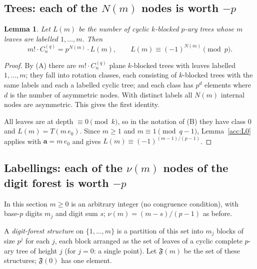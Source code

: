 \documentclass[11pt]{article}
\newtheorem{lemma}[theorem]{Lemma}
\theoremstyle{definition}
\theoremstyle{remark}
\numberwithin{equation}{section}
\numberwithin{figure}{section}
\newcommand{\C}{C_n^{(q)}}
\newcommand{\F}{\mathfrak F}
\begin{document}
\subsection{Trees: each of the $N(m)$ nodes is worth $-p$}

\begin{lemma}\label{acc:L1}
Let $L(m)$ be the number of cyclic $k$-blocked $p$-ary trees whose $m$ leaves are labelled
$1,\dots,m$. Then
\[
 m!\cdot\C=p^{N(m)}\cdot L(m),\qquad L(m)\equiv(-1)^{N(m)}\pmod p .
\]
\end{lemma}
\begin{proof}
By (A) there are $m!\cdot\C$ plane $k$-blocked trees with leaves labelled $1,\dots,m$; they
fall into rotation classes, each consisting of $k$-blocked trees with the same labels and each
a labelled cyclic tree; and each class has $p^{d}$ elements where $d$ is the number of
asymmetric nodes. With distinct labels all $N(m)$ internal nodes are asymmetric. This gives
the first identity.

All leaves are at depth $\equiv0\pmod k$, so in the notation of (B) they have class $0$ and
$L(m)=T(m\,e_0)$. Since $m\ge1$ and $m\equiv1\pmod{q-1}$, Lemma~\ref{acc:L0} applies with
$\mathbf a=m\,e_0$ and gives $L(m)\equiv(-1)^{(m-1)/(p-1)}$.
\end{proof}

\subsection{Labellings: each of the $\nu(m)$ nodes of the digit forest is worth $-p$}

In this section $m\ge0$ is an arbitrary integer (no congruence condition), with base-$p$
digits $m_j$ and digit sum $s$; $\nu(m)=(m-s)/(p-1)$ as before.

A \emph{digit-forest structure} on $\{1,\dots,m\}$ is a partition of this set into $m_j$
blocks of size $p^j$ for each $j$, each block arranged as the set of leaves of a cyclic
complete $p$-ary tree of height $j$ (for $j=0$: a single point). Let $\F(m)$ be the set of
these structures; $\F(0)$ has one element.
\end{document}
